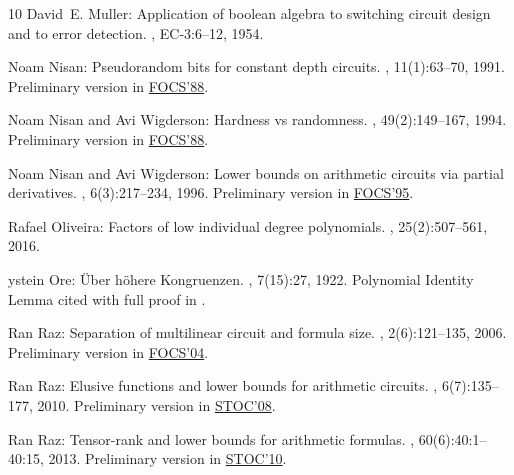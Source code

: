 \documentclass[11pt]{article}
\numberwithin{equation}{section}
\theoremstyle{definition}
\theoremstyle{plain}
\begin{document}
\begin{thebibliography}{10}
{\sc David~E. Muller}: Application of boolean algebra to switching circuit
  design and to error detection.
, EC-3:6--12, 1954.

{\sc Noam Nisan}: Pseudorandom bits for constant depth circuits.
, 11(1):63--70, 1991.
\newblock Preliminary version in
  \href{https://ieeexplore.ieee.org/document/21916}{FOCS'88}.
\newblock [\epfmtdoi{10.1007/BF01375474}]

{\sc Noam Nisan and Avi Wigderson}: Hardness vs randomness.
, 49(2):149--167, 1994.
\newblock Preliminary version in
  \href{https://ieeexplore.ieee.org/document/21916}{FOCS'88}.
\newblock [\epfmtdoi{10.1016/S0022-0000(05)80043-1}]

{\sc Noam Nisan and Avi Wigderson}: Lower bounds on arithmetic circuits via
  partial derivatives.
, 6(3):217--234, 1996.
\newblock Preliminary version in
  \href{https://ieeexplore.ieee.org/document/492458}{FOCS'95}.
\newblock [\epfmtdoi{10.1007/BF01294256}]

{\sc Rafael Oliveira}: Factors of low individual degree polynomials.
, 25(2):507--561, 2016.
\newblock [\epfmtdoi{10.1007/s00037-016-0130-2}]

{\sc {\O}ystein Ore}: {\"U}ber h{\"o}here {K}ongruenzen.
, 7(15):27, 1922.
\newblock Polynomial Identity Lemma cited with full proof in \cite[Theorem
  6.13]{lidl}.

{\sc Ran Raz}: Separation of multilinear circuit and formula size.
, 2(6):121--135, 2006.
\newblock Preliminary version in
  \href{https://doi.org/10.1109/FOCS.2004.42}{FOCS'04}.

{\sc Ran Raz}: Elusive functions and lower bounds for arithmetic circuits.
, 6(7):135--177, 2010.
\newblock Preliminary version in
  \href{https://doi.org/10.1145/1374376.1374479}{STOC'08}.

{\sc Ran Raz}: Tensor-rank and lower bounds for arithmetic formulas.
, 60(6):40:1--40:15, 2013.
\newblock Preliminary version in
  \href{https://dl.acm.org/citation.cfm?doid=1806689.1806780}{STOC'10}.
\newblock [\epfmtdoi{10.1145/2535928}]


\end{thebibliography}
\end{document}
